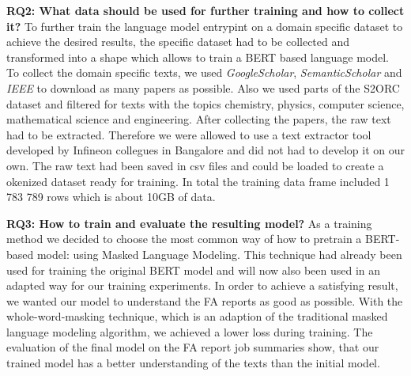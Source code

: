 \textbf{RQ2: What data should be used for further training and how to collect it?} \newline
To further train the language model entrypint on a domain specific dataset to achieve the desired results, the specific dataset had to be collected and transformed into a shape which allows to train a BERT based language model. To collect the domain specific texts, we used \textit{GoogleScholar}, \textit{SemanticScholar} and \textit{IEEE} to download as many papers as possible. Also we used parts of the S2ORC dataset and filtered for texts with the topics chemistry, physics, computer science, mathematical science and engineering. After collecting the papers, the raw text had to be extracted. Therefore we were allowed to use a text extractor tool developed by Infineon collegues in Bangalore and did not had to develop it on our own. The raw text had been saved in csv files and could be loaded to create a okenized dataset ready for training. In total the training data frame included 1 783 789 rows which is about 10GB of data.


\textbf{RQ3: How to train and evaluate the resulting model?} \newline
As a training method we decided to choose the most common way of how to pretrain a BERT-based model: using Masked Language Modeling. This technique had already been used for training the original BERT model and will now also been used in an adapted way for our training experiments. In order to achieve a satisfying result, we wanted our model to understand the FA reports as good as possible. With the whole-word-masking technique, which is an adaption of the traditional masked language modeling algorithm, we achieved a lower loss during training. The evaluation of the final model on the FA report job summaries show, that our trained model has a better understanding of the texts than the initial model.